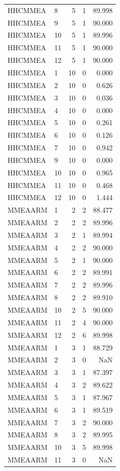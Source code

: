 \begin{longtable}{llrrr}
HHCMMEA & 8 & 5 & 1 & 89.998 \\
HHCMMEA & 9 & 5 & 1 & 90.000 \\
HHCMMEA & 10 & 5 & 1 & 89.996 \\
HHCMMEA & 11 & 5 & 1 & 90.000 \\
HHCMMEA & 12 & 5 & 1 & 90.000 \\
HHCMMEA & 1 & 10 & 0 & 0.000 \\
HHCMMEA & 2 & 10 & 0 & 0.626 \\
HHCMMEA & 3 & 10 & 0 & 0.036 \\
HHCMMEA & 4 & 10 & 0 & 0.000 \\
HHCMMEA & 5 & 10 & 0 & 0.261 \\
HHCMMEA & 6 & 10 & 0 & 0.126 \\
HHCMMEA & 7 & 10 & 0 & 0.942 \\
HHCMMEA & 9 & 10 & 0 & 0.000 \\
HHCMMEA & 10 & 10 & 0 & 0.965 \\
HHCMMEA & 11 & 10 & 0 & 0.468 \\
HHCMMEA & 12 & 10 & 0 & 1.444 \\
MMEAARM & 1 & 2 & 2 & 88.477 \\
MMEAARM & 2 & 2 & 2 & 89.996 \\
MMEAARM & 3 & 2 & 1 & 89.994 \\
MMEAARM & 4 & 2 & 2 & 90.000 \\
MMEAARM & 5 & 2 & 1 & 90.000 \\
MMEAARM & 6 & 2 & 2 & 89.991 \\
MMEAARM & 7 & 2 & 2 & 89.996 \\
MMEAARM & 8 & 2 & 2 & 89.910 \\
MMEAARM & 10 & 2 & 5 & 90.000 \\
MMEAARM & 11 & 2 & 4 & 90.000 \\
MMEAARM & 12 & 2 & 6 & 89.998 \\
MMEAARM & 1 & 3 & 1 & 88.729 \\
MMEAARM & 2 & 3 & 0 & NaN \\
MMEAARM & 3 & 3 & 1 & 87.397 \\
MMEAARM & 4 & 3 & 2 & 89.622 \\
MMEAARM & 5 & 3 & 1 & 87.967 \\
MMEAARM & 6 & 3 & 1 & 89.519 \\
MMEAARM & 7 & 3 & 2 & 90.000 \\
MMEAARM & 8 & 3 & 2 & 89.995 \\
MMEAARM & 10 & 3 & 5 & 89.998 \\
MMEAARM & 11 & 3 & 0 & NaN \\

\end{longtable}
